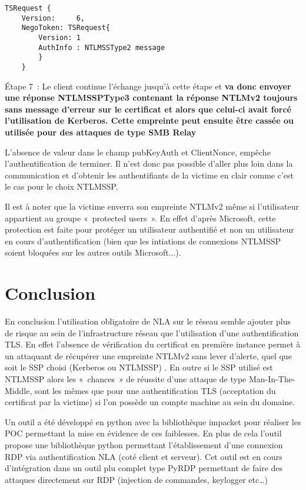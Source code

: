 \begin{lstlisting}[frame=single,basicstyle=\tiny]
TSRequest {
	Version:     6,
	NegoToken: TSRequest{
		Version: 1
		AuthInfo : NTLMSSType2 message
		}
	}
\end{lstlisting}


Étape 7 :
Le client continue l'échange jusqu'à cette étape et \textbf{va donc envoyer une réponse NTLMSSPType3 contenant la réponse NTLMv2 toujours sans message d’erreur sur le certificat et alors que celui-ci avait forcé l’utilisation de Kerberos. Cette empreinte peut ensuite être cassée ou utilisée pour des attaques de type SMB Relay}

L’absence de valeur dans le champ pubKeyAuth et ClientNonce, empêche l’authentification de terminer. Il n’est donc pas possible d’aller plus loin dans la communication et d’obtenir les authentifiants de la victime en clair comme c’est le cas pour le choix NTLMSSP.

Il est à noter que la victime enverra son empreinte NTLMv2 même si l’utilisateur appartient au groupe « protected users ». En effet d’après Microsoft, cette protection est faite pour protéger un utilisateur authentifié et non un utilisateur en cours d’authentification (bien que les intiations de connexions NTLMSSP soient bloquées sur les autres outils Microsoft...).

\section{Conclusion}
En conclusion l’utilisation obligatoire de NLA sur le réseau semble ajouter plus de risque au sein de l’infrastructure réseau que l’utilisation d’une authentification TLS.
En effet l’absence de vérification du certificat en première instance permet à un attaquant de récupérer une empreinte NTLMv2 sans lever d’alerte, quel que soit le SSP choisi (Kerberos ou NTLMSSP) .
En outre si le SSP utilisé est NTLMSSP alors les « chances » de réussite d’une attaque de type Man-In-The-Middle, sont les mêmes que pour une authentification TLS (acceptation du certificat par la victime) si l’on possède un compte machine au sein du domaine.

Un outil a été développé en python avec la bibliothèque impacket pour réaliser les POC permettant la mise en évidence de ces faiblesses.
En plus de cela l’outil propose une bibliothèque python permettant l’établissement d’une connexion RDP via authentification NLA (coté client et serveur). Cet outil est en cours d’intégration dans un outil plu complet type PyRDP permettant de faire des attaques directement sur RDP (injection de commandes, keylogger etc…)

